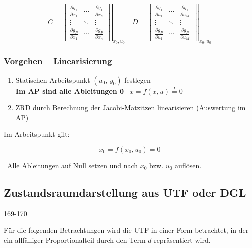 $$
    C =
    \left. \begin{bmatrix}
        \frac{\partial g_1}{\partial x_1} & \cdots & \frac{\partial g_1}{\partial x_n} \\
        \vdots & \ddots & \vdots \\
        \frac{\partial g_P}{\partial x_1} & \cdots & \frac{\partial g_P}{\partial x_n}
    \end{bmatrix} \right|_{x_0, u_0}
    \quad
    D =
    \left. \begin{bmatrix}
        \frac{\partial g_1}{\partial u_1} & \cdots & \frac{\partial g_1}{\partial u_M} \\
        \vdots & \ddots & \vdots \\
        \frac{\partial g_P}{\partial u_1} & \cdots & \frac{\partial g_P}{\partial u_M}
    \end{bmatrix} \right|_{x_0, u_0}
$$


\subsubsection{Vorgehen -- Linearisierung}

\begin{enumerate}
    \item Statischen Arbeitspunkt $(u_0, \, y_0)$ festlegen \\
        \textbf{Im AP sind alle Ableitungen $\bm{0}$} \textrightarrow\ $\dot{x} = f(x, u) \overset{!}{=} 0$
    \item ZRD durch Berechnung der Jacobi-Matzitzen linearisieren (Auswertung im AP)
\end{enumerate}

Im Arbeitspunkt gilt:

\[
\dot{x}_0=f(x_0,u_0)=0
\]

\textrightarrow\ Alle Ableitungen auf Null setzen und nach $x_0$ bzw. $u_0$ auflösen.

\subsection{Zustandsraumdarstellung aus UTF oder DGL}{169-170}
\label{Zustandsraumdarstellung aus einer UTF oder DGL}

Für die folgenden Betrachtungen wird die UTF in einer Form betrachtet, in der ein allfälliger Proportionalteil durch den Term $d$
repräsentiert wird.

